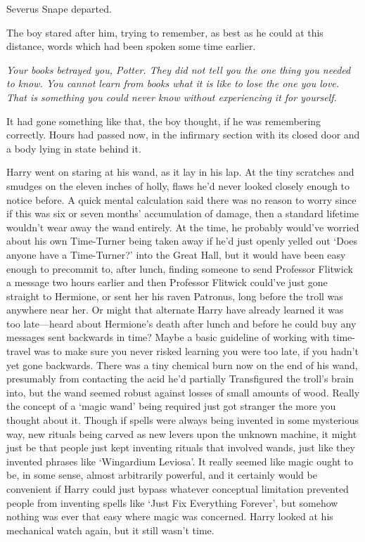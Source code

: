Severus Snape departed.

The boy stared after him, trying to remember, as best as he could at this
distance, words which had been spoken some time earlier.

\emph{Your books betrayed you, Potter. They did not tell you the one thing you
needed to know. You cannot learn from books what it is like to lose the one you
love. That is something you could never know without experiencing it for
yourself.}

It had gone something like that, the boy thought, if he was remembering
correctly.
\sbreak
Hours had passed now, in the infirmary section with its closed door and a body
lying in state behind it.

Harry went on staring at his wand, as it lay in his lap. At the tiny scratches
and smudges on the eleven inches of holly, flaws he'd never looked closely
enough to notice before. A quick mental calculation said there was no reason to
worry since if this was six or seven months' accumulation of damage, then a
standard lifetime wouldn't wear away the wand entirely. At the time, he
probably would've worried about his own Time-Turner being taken away if he'd
just openly yelled out `Does anyone have a Time-Turner?' into the Great Hall,
but it would have been easy enough to precommit to, after lunch, finding
someone to send Professor Flitwick a message two hours earlier and then
Professor Flitwick could've just gone straight to Hermione, or sent her his
raven Patronus, long before the troll was anywhere near her. Or might that
alternate Harry have already learned it was too late—heard about Hermione's
death after lunch and before he could buy any messages sent backwards in time?
Maybe a basic guideline of working with time-travel was to make sure you never
risked learning you were too late, if you hadn't yet gone backwards. There was
a tiny chemical burn now on the end of his wand, presumably from contacting the
acid he'd partially Transfigured the troll's brain into, but the wand seemed
robust against losses of small amounts of wood. Really the concept of a `magic
wand' being required just got stranger the more you thought about it. Though if
spells were always being invented in some mysterious way, new rituals being
carved as new levers upon the unknown machine, it might just be that people
just kept inventing rituals that involved wands, just like they invented
phrases like `Wingardium Leviosa'. It really seemed like magic ought to be, in
some sense, almost arbitrarily powerful, and it certainly would be convenient
if Harry could just bypass whatever conceptual limitation prevented people from
inventing spells like `Just Fix Everything Forever', but somehow nothing was
ever that easy where magic was concerned. Harry looked at his mechanical watch
again, but it still wasn't time.

